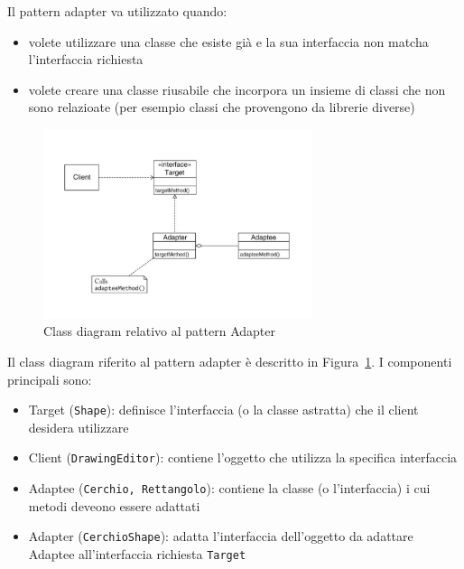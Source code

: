 \documentclass{article}
\begin{document}
Il pattern adapter va utilizzato quando:
\begin{itemize}
\item volete utilizzare una classe che esiste gi\`a e la sua interfaccia non matcha l'interfaccia richiesta
\item volete creare una classe riusabile che incorpora un insieme di classi che non sono relazioate (per esempio classi che provengono da librerie diverse)
\end{itemize}


\begin{figure}
\centering
\includegraphics[width=0.7\textwidth]{Img/Adapter.pdf}
\caption{Class diagram relativo al pattern Adapter}
\label{Fig:FactoryAdapterConcepts}
\end{figure}


\noindent Il class diagram riferito al pattern adapter \`e descritto in Figura~\ref{Fig:FactoryAdapterConcepts}. I componenti principali sono:
\begin{itemize}
\item Target (\texttt{Shape}): definisce l'interfaccia (o la classe astratta) che il client desidera utilizzare
\item Client (\texttt{DrawingEditor}): contiene l'oggetto che utilizza la specifica interfaccia
\item Adaptee (\texttt{Cerchio, Rettangolo}): contiene la classe (o l'interfaccia) i cui metodi deveono essere adattati
\item Adapter (\texttt{CerchioShape}): adatta l'interfaccia dell'oggetto da adattare Adaptee all'interfaccia richiesta \texttt{Target}
\end{itemize}
\end{document}
